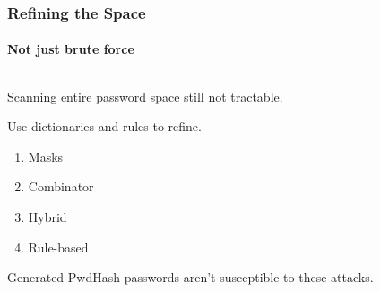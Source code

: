 \documentclass[handout, notes=hide]{beamer}
\begin{document}


\begin{frame}
\frametitle{Refining the Space}
\framesubtitle{Not just brute force}
\setlength{\parskip}{0.5em}

\begin{columns}[T]
\begin{column}[T]{1.0\textwidth}
\setlength{\parskip}{0.5em}

Scanning entire password space still not tractable.

Use dictionaries and rules to refine.

\begin{enumerate}
\item Masks
\item Combinator
\item Hybrid
\item Rule-based
\end{enumerate}

Generated PwdHash passwords aren't susceptible to these attacks.


\end{column}
\end{columns}


\end{frame}

\end{document}
